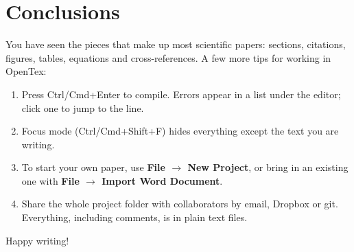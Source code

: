 
\section{Conclusions}
\label{sec:conclusions}

You have seen the pieces that make up most scientific papers: sections, citations, figures, tables, equations and cross-references.
A few more tips for working in OpenTex:
\begin{enumerate}
  \item Press Ctrl/Cmd+Enter to compile. Errors appear in a list under the editor; click one to jump to the line.
  \item Focus mode (Ctrl/Cmd+Shift+F) hides everything except the text you are writing.
  \item To start your own paper, use \textbf{File $\rightarrow$ New Project}, or bring in an existing one with \textbf{File $\rightarrow$ Import Word Document}.
  \item Share the whole project folder with collaborators by email, Dropbox or git. Everything, including comments, is in plain text files.
\end{enumerate}

Happy writing!
